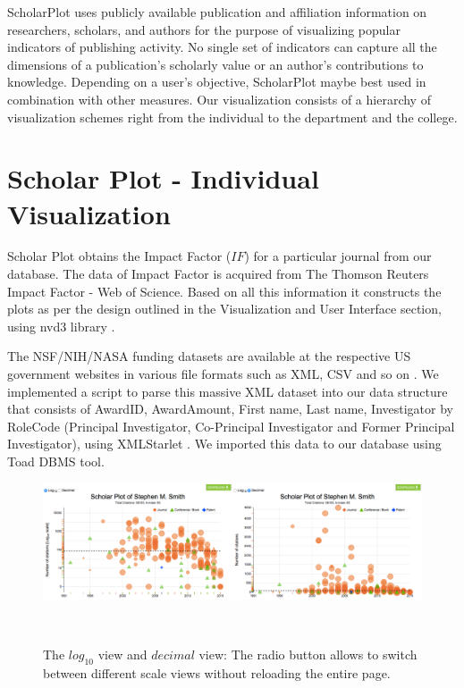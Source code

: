 ScholarPlot uses publicly available publication and affiliation information on researchers, scholars, and authors for the purpose of visualizing popular indicators of publishing activity. No single set of indicators can capture all the dimensions of a publication's scholarly value or an author's contributions to knowledge. Depending on a user's objective, ScholarPlot maybe best used in combination with other measures. Our visualization consists of a hierarchy of visualization schemes right from the individual to the department and the college.









\section{Scholar Plot - Individual Visualization}
Scholar Plot obtains the Impact Factor ($IF$) for a particular journal from our database. The data of Impact Factor is acquired from The Thomson Reuters Impact Factor - Web of Science. Based on all this information it constructs the plots as per the design outlined in the Visualization and User Interface section, using nvd3 library \cite{nvd3org}.


The NSF/NIH/NASA funding datasets are available at the respective US government websites in various file formats such as XML, CSV and so on \cite{nsf, nih}. We implemented a script to parse this massive XML dataset into our data structure that consists of AwardID, AwardAmount, First name, Last name, Investigator by RoleCode (Principal Investigator, Co-Principal Investigator and Former Principal Investigator), using XMLStarlet \cite{XMLStarlet}. We imported this data to our database using Toad DBMS tool. %

\begin{figure}%
\centering
  \includegraphics[width=1\textwidth]{figures/fig_scaleView}
  \caption{The $log_{10}$ view and $decimal$ view: The radio button allows to switch between different scale views without reloading the entire page.}~\label{fig-scale}
\end{figure}

